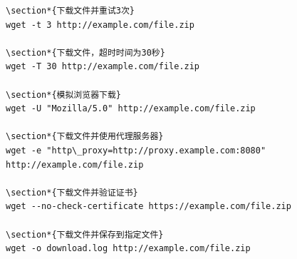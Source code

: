 \documentclass[12pt,UTF8]{ctexbook}
\begin{document}
\begin{verbatim}
\section*{下载文件并重试3次}
wget -t 3 http://example.com/file.zip

\section*{下载文件，超时时间为30秒}
wget -T 30 http://example.com/file.zip

\section*{模拟浏览器下载}
wget -U "Mozilla/5.0" http://example.com/file.zip

\section*{下载文件并使用代理服务器}
wget -e "http\_proxy=http://proxy.example.com:8080" http://example.com/file.zip

\section*{下载文件并验证证书}
wget --no-check-certificate https://example.com/file.zip

\section*{下载文件并保存到指定文件}
wget -o download.log http://example.com/file.zip
\end{verbatim}
\end{document}
